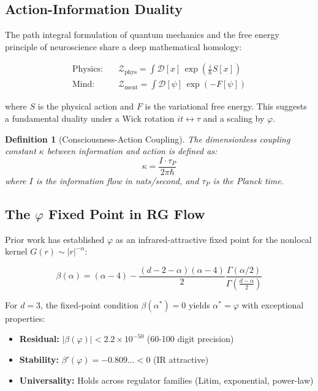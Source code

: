\documentclass[14pt, a4paper]{extarticle}
\newtheorem{definition}{Definition}
\begin{document}
\subsection{Action-Information Duality}

The path integral formulation of quantum mechanics and the free energy principle of neuroscience share a deep mathematical homology:

\begin{align}
    \text{Physics:} \quad & \mathcal{Z}_{\text{phys}} = \int \mathcal{D}[x] \, \exp\left( \frac{i}{\hbar} S[x] \right) \label{eq:path_int} \\
    \text{Mind:} \quad & \mathcal{Z}_{\text{ment}} = \int \mathcal{D}[\psi] \, \exp\left( -F[\psi] \right) \label{eq:free_energy}
\end{align}

where $S$ is the physical action and $F$ is the variational free energy. This suggests a fundamental duality under a Wick rotation $it \leftrightarrow \tau$ and a scaling by $\varphi$.

\begin{definition}[Consciousness-Action Coupling]
The dimensionless coupling constant $\kappa$ between information and action is defined as:
\begin{equation}
\kappa = \frac{I \cdot \tau_P}{2\pi\hbar}
\label{eq:kappa_def}
\end{equation}
where $I$ is the information flow in nats/second, and $\tau_P$ is the Planck time.
\end{definition}

\subsection{The $\varphi$ Fixed Point in RG Flow}

Prior work has established $\varphi$ as an infrared-attractive fixed point for the nonlocal kernel $G(r) \sim |r|^{-\alpha}$:

\begin{equation}
\beta(\alpha) = (\alpha - 4) - \frac{(d-2-\alpha)(\alpha-4)}{2} \frac{\Gamma(\alpha/2)}{\Gamma\left(\frac{d-\alpha}{2}\right)}
\end{equation}

For $d=3$, the fixed-point condition $\beta(\alpha^*) = 0$ yields $\alpha^* = \varphi$ with exceptional properties:
\begin{itemize}
    \item \textbf{Residual:} $|\beta(\varphi)| < 2.2 \times 10^{-50}$ (60-100 digit precision)
    \item \textbf{Stability:} $\beta'(\varphi) = -0.809\ldots < 0$ (IR attractive)
    \item \textbf{Universality:} Holds across regulator families (Litim, exponential, power-law)
\end{itemize}
\end{document}
